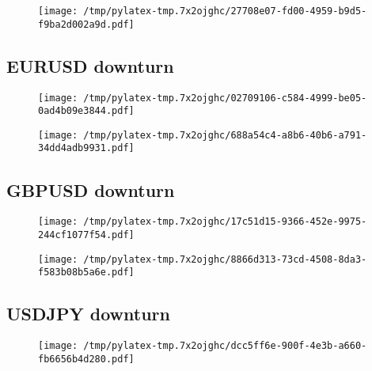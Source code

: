 \documentclass{article}%
\begin{document}
%


\begin{figure}[htbp]%
\centering%
\texttt{[image: /tmp/pylatex-tmp.7x2ojghc/27708e07-fd00-4959-b9d5-f9ba2d002a9d.pdf]}%
\end{figure}

%
\newpage %
\subsection{EURUSD downturn}%
\label{subsec:EURUSDdownturn}%


\begin{figure}[htbp]%
\centering%
\texttt{[image: /tmp/pylatex-tmp.7x2ojghc/02709106-c584-4999-be05-0ad4b09e3844.pdf]}%
\end{figure}

%


\begin{figure}[htbp]%
\centering%
\texttt{[image: /tmp/pylatex-tmp.7x2ojghc/688a54c4-a8b6-40b6-a791-34dd4adb9931.pdf]}%
\end{figure}

%
\newpage %
\subsection{GBPUSD downturn}%
\label{subsec:GBPUSDdownturn}%


\begin{figure}[htbp]%
\centering%
\texttt{[image: /tmp/pylatex-tmp.7x2ojghc/17c51d15-9366-452e-9975-244cf1077f54.pdf]}%
\end{figure}

%


\begin{figure}[htbp]%
\centering%
\texttt{[image: /tmp/pylatex-tmp.7x2ojghc/8866d313-73cd-4508-8da3-f583b08b5a6e.pdf]}%
\end{figure}

%
\newpage %
\subsection{USDJPY downturn}%
\label{subsec:USDJPYdownturn}%


\begin{figure}[htbp]%
\centering%
\texttt{[image: /tmp/pylatex-tmp.7x2ojghc/dcc5ff6e-900f-4e3b-a660-fb6656b4d280.pdf]}%
\end{figure}
\end{document}
